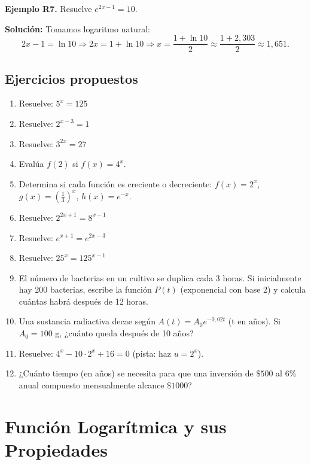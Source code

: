 \documentclass[12pt, letterpaper]{article}
\begin{document}
  \textbf{Ejemplo R7.} Resuelve $e^{2x - 1} = 10$.

  \begin{cuadrosolucion}
    \textbf{Solución:} Tomamos logaritmo natural:
    $$2x - 1 = \ln 10 \Rightarrow 2x = 1 + \ln 10 \Rightarrow x = \frac{1 + \ln 10}{2} \approx \frac{1 + 2{,}303}{2} \approx 1{,}651.$$
  \end{cuadrosolucion}

  \subsection{Ejercicios propuestos}

  \begin{enumerate}[series=ejercicios, leftmargin=*]
    \item \facil{} Resuelve: $5^x = 125$
    \item \facil{} Resuelve: $2^{x-3} = 1$
    \item \facil{} Resuelve: $3^{2x} = 27$
    \item \facil{} Evalúa $f(2)$ si $f(x) = 4^x$.
    \item \facil{} Determina si cada función es creciente o decreciente: $f(x) = 2^x$, $g(x) = \left(\frac{1}{3}\right)^x$, $h(x) = e^{-x}$.
    \item \medio{} Resuelve: $2^{2x+1} = 8^{x-1}$
    \item \medio{} Resuelve: $e^{x+1} = e^{2x-3}$
    \item \medio{} Resuelve: $25^x = 125^{x-1}$
    \item \medio{} El número de bacterias en un cultivo se duplica cada 3 horas. Si inicialmente hay 200 bacterias, escribe la función $P(t)$ (exponencial con base 2) y calcula cuántas habrá después de 12 horas.
    \item \medio{} Una sustancia radiactiva decae según $A(t) = A_0 e^{-0{,}02t}$ (t en años). Si $A_0 = 100$ g, ¿cuánto queda después de 10 años?
    \item \dificil{} Resuelve: $4^x - 10 \cdot 2^x + 16 = 0$ (pista: haz $u = 2^x$).
    \item \dificil{} ¿Cuánto tiempo (en años) se necesita para que una inversión de $\$500$ al $6\%$ anual compuesto mensualmente alcance $\$1000$?
  \end{enumerate}


  \section{Función Logarítmica y sus Propiedades}
\end{document}
